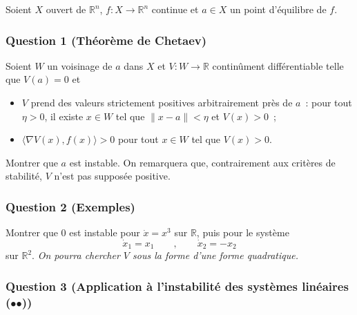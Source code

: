 Soient \(X\) ouvert de \(\mathbb{R}^n\), \(f: X \to \mathbb{R}^n\)
continue et \(a\in X\) un point d'équilibre de \(f\).

\hypertarget{instab-1}{%
\subsubsection*{Question 1 (Théorème de Chetaev)}\label{instab-1}}


Soient \(W\) un voisinage de \(a\) dans \(X\) et
\(V:W\to\mathbb{R}\) continûment différentiable telle que \(V(a)=0\) et

\begin{itemize}
\tightlist
\item
  \(V\) prend des valeurs strictement positives arbitrairement près de
  \(a\)~: pour tout \(\eta>0\), il existe \(x\in W\) tel que
  \(\|x-a\|<\eta\) et \(V(x)>0\)~;
\item
  \(\langle\nabla V (x), f(x)\rangle > 0\) pour tout \(x\in W\) tel que
  \(V(x)>0\).
\end{itemize}

Montrer que \(a\) est instable. On remarquera que, contrairement aux
critères de stabilité, \(V\) n'est pas supposée positive.

\hypertarget{instab-2}{%
\subsubsection*{Question 2 (Exemples)}\label{instab-2}}


Montrer que \(0\) est instable pour \(\dot{x} = x^3\) sur \(\mathbb{R}\),
puis pour le système \[
\dot{x}_1 = x_1 \qquad , \qquad \dot{x}_2 = -x_2
\] sur \(\mathbb{R}^2\). \emph{On pourra chercher \(V\) sous la forme
d'une forme quadratique.}

\hypertarget{instab-3}{%
\subsubsection*{Question 3 (Application à l'instabilité des systèmes
linéaires (\(\mathord{\bullet}\mathord{\bullet}\)))}\label{instab-3}}


